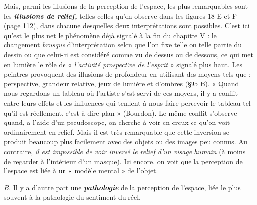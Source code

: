 Mais, parmi les illusions de la perception de l’espace, les plus
remarquables sont les \textbf{\textit {illusions de relief,}} telles celles qu’on observe
dans les figures 18 E et F (page 112), dans chacune desquelles deux
interprétations sont possibles. C’est ici qu’est le plus net le phénomène
déjà signalé à la fin du chapitre V : le changement {\it brusque} d’interprétation
selon que l’on fixe telle ou telle partie du dessin ou que
celui-ci est considéré comme vu de dessus ou de dessous, ce qui met
en lumière le rôle de « {\it l’activité prospective de l'esprit} » signalé plus
haut. Les peintres provoquent des illusions de profondeur en utilisant
des moyens tels que : perspective, grandeur relative, jeux de
lumière et d’ombres (\S 95 B). « Quand nous regardons un tableau où
l'artiste s’est servi de ces moyens, il y a conflit entre leurs effets
et les influences qui tendent à nous faire percevoir le tableau tel
qu’il est réellement, c’est-à-dire plan » (Bourdon). Le même conflit
s’observe quand, a l’aide d’un pseudoscope, on cherche à voir en creux
ce qu’on voit ordinairement en relief. Mais il est très remarquable
que cette inversion se produit beaucoup plus facilement avec des
objets ou des images peu connus. Au contraire, {\it il est impossible de
voir inversé le relief d’un visage humain} (à moins de regarder à l’intérieur
d’un masque). Ici encore, on voit que la perception de l’espace
est liée à un « modèle mental » de l’objet.

{\it B.} Il y a d’autre part une \textbf{\textit {pathologie}} de la perception de l’espace,
liée le plus souvent à la pathologie du sentiment du réel.

